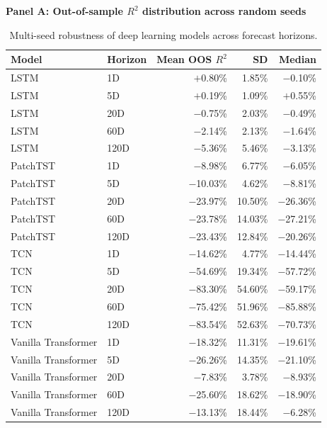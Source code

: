 \documentclass[12pt,twoside]{ord}
\begin{document}
\begin{table}[htbp]
\centering
\caption{Multi-seed robustness of deep learning models across forecast horizons.}\label{tab:dl_multiseed_robustness}
\renewcommand{\arraystretch}{0.96}
\setlength{\tabcolsep}{4.5pt}
\textbf{Panel A: Out-of-sample $R^2$ distribution across random seeds}\\[3pt]
\begin{tabular}{llrrr}
\hline
Model & Horizon & Mean OOS $R^2$ & SD & Median \\
\hline
LSTM & 1D   & $+$0.80\% & 1.85\% & $-$0.10\% \\
LSTM & 5D   & $+$0.19\% & 1.09\% & $+$0.55\% \\
LSTM & 20D  & $-$0.75\% & 2.03\% & $-$0.49\% \\
LSTM & 60D  & $-$2.14\% & 2.13\% & $-$1.64\% \\
LSTM & 120D & $-$5.36\% & 5.46\% & $-$3.13\% \\
\hline
PatchTST & 1D   & $-$8.98\% & 6.77\% & $-$6.05\% \\
PatchTST & 5D   & $-$10.03\% & 4.62\% & $-$8.81\% \\
PatchTST & 20D  & $-$23.97\% & 10.50\% & $-$26.36\% \\
PatchTST & 60D  & $-$23.78\% & 14.03\% & $-$27.21\% \\
PatchTST & 120D & $-$23.43\% & 12.84\% & $-$20.26\% \\
\hline
TCN & 1D   & $-$14.62\% & 4.77\% & $-$14.44\% \\
TCN & 5D   & $-$54.69\% & 19.34\% & $-$57.72\% \\
TCN & 20D  & $-$83.30\% & 54.60\% & $-$59.17\% \\
TCN & 60D  & $-$75.42\% & 51.96\% & $-$85.88\% \\
TCN & 120D & $-$83.54\% & 52.63\% & $-$70.73\% \\
\hline
Vanilla Transformer & 1D   & $-$18.32\% & 11.31\% & $-$19.61\% \\
Vanilla Transformer & 5D   & $-$26.26\% & 14.35\% & $-$21.10\% \\
Vanilla Transformer & 20D  & $-$7.83\% & 3.78\% & $-$8.93\% \\
Vanilla Transformer & 60D  & $-$25.60\% & 18.62\% & $-$18.90\% \\
Vanilla Transformer & 120D & $-$13.13\% & 18.44\% & $-$6.28\% \\
\hline
\end{tabular}


\end{table}
\end{document}
